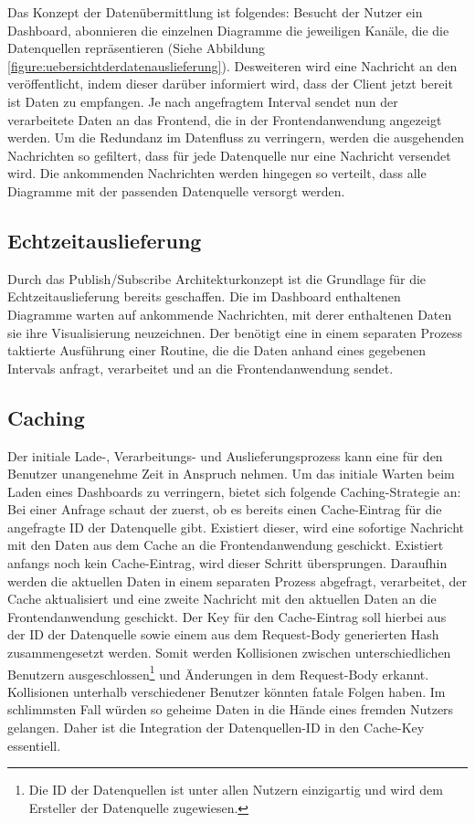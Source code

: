 Das Konzept der Datenübermittlung ist folgendes: Besucht der Nutzer ein Dashboard,
abonnieren die einzelnen Diagramme die jeweiligen Kanäle, die die Datenquellen 
repräsentieren (Siehe Abbildung \ref{figure:uebersichtderdatenauslieferung}).
Desweiteren wird eine Nachricht an den  veröffentlicht,
indem dieser darüber informiert wird, dass der Client jetzt bereit ist Daten zu empfangen.
Je nach angefragtem Interval sendet nun der  verarbeitete
Daten an das Frontend, die in der Frontendanwendung angezeigt werden. Um die
Redundanz im Datenfluss zu verringern, werden die ausgehenden Nachrichten
so gefiltert, dass für jede Datenquelle nur eine Nachricht versendet wird. Die ankommenden
Nachrichten werden hingegen so verteilt, dass alle Diagramme mit der passenden Datenquelle
versorgt werden.

\subsection{Echtzeitauslieferung}
\label{subsec:echtzeitauslieferung}
Durch das Publish/Subscribe Architekturkonzept ist die Grundlage für die Echtzeitauslieferung
bereits geschaffen. Die im Dashboard enthaltenen Diagramme warten auf ankommende Nachrichten,
mit derer enthaltenen Daten sie ihre Visualisierung neuzeichnen. Der 
benötigt eine in einem separaten Prozess taktierte Ausführung einer Routine, die die Daten
anhand eines gegebenen Intervals anfragt, verarbeitet und an die Frontendanwendung sendet.

\subsection{Caching}
\label{subsec:caching}
Der initiale Lade-, Verarbeitungs- und Auslieferungsprozess kann eine für den Benutzer
unangenehme Zeit in Anspruch nehmen. Um das initiale Warten beim Laden eines Dashboards
zu verringern, bietet sich folgende Caching-Strategie an: Bei einer Anfrage schaut
der  zuerst, ob es bereits einen Cache-Eintrag für die
angefragte ID der Datenquelle gibt. Existiert dieser, wird eine sofortige Nachricht
mit den Daten aus dem Cache an die Frontendanwendung geschickt. Existiert anfangs noch
kein Cache-Eintrag, wird dieser Schritt übersprungen. Daraufhin werden
die aktuellen Daten in einem separaten Prozess abgefragt, verarbeitet, der Cache
aktualisiert und eine zweite Nachricht mit den aktuellen Daten an die Frontendanwendung
geschickt. Der Key für den Cache-Eintrag soll hierbei aus der ID der Datenquelle sowie
einem aus dem Request-Body generierten Hash zusammengesetzt werden. Somit werden
Kollisionen zwischen unterschiedlichen Benutzern ausgeschlossen\footnote{Die ID der Datenquellen ist
unter allen Nutzern einzigartig und wird dem Ersteller der Datenquelle zugewiesen.}
und Änderungen in dem Request-Body erkannt. Kollisionen unterhalb verschiedener
Benutzer könnten fatale Folgen haben. Im schlimmsten Fall würden so geheime Daten
in die Hände eines fremden Nutzers gelangen. Daher ist die Integration der Datenquellen-ID
in den Cache-Key essentiell.

